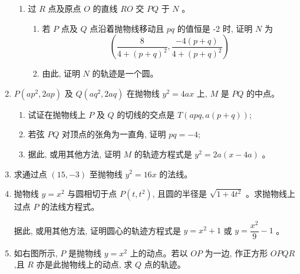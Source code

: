 \documentclass[10pt]{article}
\begin{document}
\begin{enumerate}
\begin{enumerate}
    \item 过 $R$ 点及原点 $O$ 的直线 $RO$ 交 $PQ$ 于 $N$ 。
    \begin{enumerate}
      \item 若 $P$ 点及 $Q$ 点沿着抛物线移动且 $p q$ 的值恒是 -2 时, 证明 $N$ 为
      $$
      \left(\dfrac{8}{4+(p+q)^{2}}, \dfrac{-4(p+q)}{4+(p+q)^{2}}\right)
      $$
      \item 由此, 证明 $N$ 的轨迹是一个圆。
    \end{enumerate}
  \end{enumerate}

  \item $P\left(a p^{2}, 2 a p\right)$ 及 $Q\left(a q^{2}, 2 a q\right)$ 在抛物线 $y^{2}=4 a x$ 上, $M$ 是 $PQ$ 的中点。

  \begin{enumerate}
    \item 试证在抛物线上 $P$ 及 $Q$ 的切线的交点是 $T(a p q, a(p+q))$;

    \item 若弦 $PQ$ 对顶点的张角为一直角, 证明 $p q=-4$;
    
    \item 据此, 或用其他方法, 证明 $M$ 的轨迹方程式是 $y^{2}=2 a(x-4 a)$ 。
  \end{enumerate}

  \item 求通过点 $(15,-3)$ 至抛物线 $y^{2}=16 x$ 的法线。

  \item 抛物线 $y=x^{2}$ 与圆相切于点 $P\left(t, t^{2}\right)$, 且圆的半径是 $\sqrt{1+4 t^{2}}$ 。求抛物线上过点 $P$ 的法线方程式。

据此, 或用其他方法, 证明圆心的轨迹方程式是 $y=x^{2}+1$ 或 $y=\dfrac{x^{2}}{9}-1$ 。

  \item 如右图所示, $P$ 是抛物线 $y=x^{2}$ 上的动点。若以 $O P$ 为一边, 作正方形 $O P Q R$,且 $R$ 亦是此抛物线上的动点, 求 $Q$ 点的轨迹。


\end{enumerate}
\end{document}
